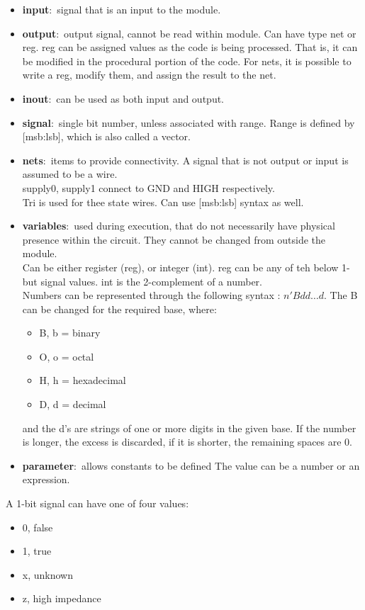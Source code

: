 \documentclass[nobib]{tufte-handout}
\newcommand{\defn}[2]{\noindent\textbf{#1}:\ #2}
\begin{document}
\begin{itemize}
    \item \defn{input}{signal that is an input to the module.}
    \item \defn{output}{output signal, cannot be read within module.} Can have type net or reg. reg can be assigned values as the code is being processed. That is, it can be modified in the procedural portion of the code. For nets, it is possible to write a reg, modify them, and assign the result to the net.
    \item \defn{inout}{can be used as both input and output.}
    \item \defn{signal}{single bit number, unless associated with range. Range is defined by [msb:lsb], which is also called a vector.}
    \item \defn{nets}{items to provide connectivity. A signal that is not output or input is assumed to be a wire.}\\ supply0, supply1 connect to GND and HIGH respectively.\\ Tri is used for thee state wires. Can use [msb:lsb] syntax as well.
    \item \defn{variables}{used during execution, that do not necessarily have physical presence within the circuit. They cannot be changed from outside the module.}\\Can be either register (reg), or integer (int). reg can be any of teh below 1-but signal values. int is the 2-complement of a number.\\ Numbers can be represented through the following syntax : $n'Bdd\ldots d$. The B can be changed for the required base, where:
          \begin{itemize}
              \item B, b = binary
              \item O, o = octal
              \item H, h = hexadecimal
              \item D, d = decimal
          \end{itemize}
          and the d's are strings of one or more digits in the given base. If the number is longer, the excess is discarded, if it is shorter, the remaining spaces are 0.
    \item \defn{parameter}{allows constants to be defined} The value can be a number or an expression.
\end{itemize}
A 1-bit signal can have one of four values:
\begin{itemize}
    \item 0, false
    \item 1, true
    \item x, unknown
    \item z, high impedance
\end{itemize}
\end{document}
